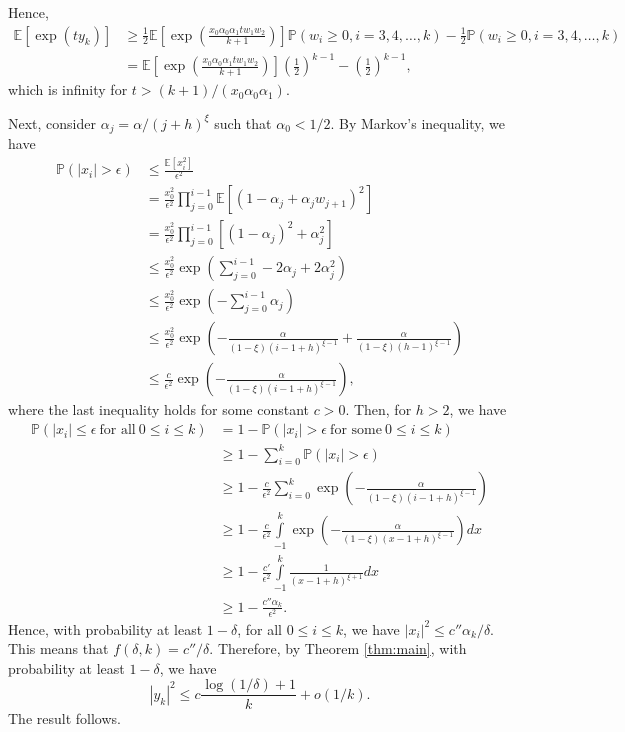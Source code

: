 \documentclass[letterpaper, 10 pt]{article}
\newcommand{\E}{\mathbb{E}}
\begin{document}
    Hence, 
    \begin{align*}
        \E[\exp(ty_k)] &\geq \frac{1}{2}\E\left[\exp\left(\frac{x_0\alpha_0\alpha_1tw_1w_2}{k+1}\right)\right]  \mathbb{P}(w_i\geq0, i=3,4,\dots,k) - \frac{1}{2}\mathbb{P}(w_i\geq0, i=3,4,\dots,k)\\
        &= \E\left[\exp\left(\frac{x_0\alpha_0\alpha_1tw_1w_2}{k+1}\right)\right] \left(\frac{1}{2}\right)^{k-1} - \left(\frac{1}{2}\right)^{k-1},
    \end{align*}
    which is infinity for $t>(k+1)/(x_0\alpha_0\alpha_1)$.

    \medskip

    Next, consider $\alpha_j = \alpha/(j+h)^{\xi}$ such that $\alpha_0<1/2$. By Markov's inequality, we have
    \begin{align*}
        \mathbb{P}(|x_i|>\epsilon)&\leq \frac{\E[x_i^2]}{\epsilon^2} \\
        &= \frac{x_0^2}{\epsilon^2} \prod_{j=0}^{i-1} \E[(1-\alpha_j+\alpha_jw_{j+1})^2]\\
        &=\frac{x_0^2}{\epsilon^2} \prod_{j=0}^{i-1} [(1-\alpha_j)^2+\alpha_j^2]\\
        &\leq\frac{x_0^2}{\epsilon^2} \exp \left(\sum_{j=0}^{i-1} -2\alpha_j+2\alpha_j^2\right)\\
        &\leq\frac{x_0^2}{\epsilon^2} \exp \left(-\sum_{j=0}^{i-1} \alpha_j\right)\\
        &\leq\frac{x_0^2}{\epsilon^2} \exp \left(-\frac{\alpha}{(1-\xi)(i-1+h)^{\xi-1}}+\frac{\alpha}{(1-\xi)(h-1)^{\xi-1}} \right)\\
        &\leq\frac{c}{\epsilon^2} \exp \left(-\frac{\alpha}{(1-\xi)(i-1+h)^{\xi-1}} \right),
    \end{align*}
    where the last inequality holds for some constant $c>0$. Then, for $h> 2$, we have
    \begin{align*}
        \mathbb{P}(|x_i|\leq \epsilon ~\text{for all}~ 0\leq i\leq k) &= 1-\mathbb{P}(|x_i|> \epsilon ~\text{for some}~ 0\leq i\leq k)\\
        &\geq 1-\sum_{i=0}^k \mathbb{P}(|x_i|> \epsilon)\\
        &\geq 1-\frac{c}{\epsilon^2} \sum_{i=0}^k \exp \left(-\frac{\alpha}{(1-\xi)(i-1+h)^{\xi-1}} \right)\\
        &\geq 1-\frac{c}{\epsilon^2} \int\limits_{-1}^k \exp \left(-\frac{\alpha}{(1-\xi)(x-1+h)^{\xi-1}} \right)dx\\
        &\geq 1-\frac{c'}{\epsilon^2} \int\limits_{-1}^k \frac{1}{(x-1+h)^{\xi+1}} dx\\
        &\geq 1-\frac{c''\alpha_k}{\epsilon^2} .
    \end{align*}
    Hence, with probability at least $1-\delta$, for all $0\leq i\leq k$, we have $|x_i|^2\leq c'' \alpha_k/\delta$. This means that $f(\delta,k)=c''/\delta$. Therefore, by Theorem \ref{thm:main}, with probability at least $1-\delta$, we have
    \[ |y_k|^2\leq c\frac{\log(1/\delta) + 1}{k} + o(1/k). \]
    The result follows.     
\end{document}
